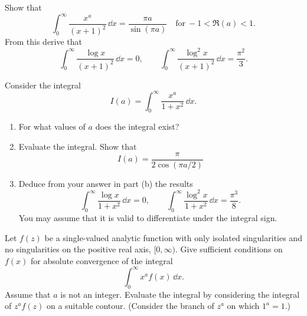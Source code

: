 {\begin{Exercise}
\end{Exercise}







\begin{Exercise}
  \label{exercise x^a/(x+1)^2}
  Show that
  \[
  \int_0^\infty \frac{x^a}{(x+1)^2}\,\dd x = \frac{\pi a}{\sin(\pi a)} \quad
  \mathrm{for}\ -1 < \Re(a) < 1.
  \]
  From this derive that
  \[
  \int_0^\infty \frac{\log x}{(x+1)^2} \,\dd x = 0, \qquad
  \int_0^\infty \frac{\log^2 x}{(x+1)^2}\,\dd x = \frac{\pi^2}{3}.
  \]

\end{Exercise}






\begin{Exercise}
  \label{exercise x^a/(1+x^2)}
  Consider the integral
  \[
  I(a) = \int_0^\infty \frac{x^a}{ 1 + x^2 } \,\dd x.
  \]
  \begin{enumerate}
  \item
    For what values of $a$ does the integral exist?
  \item
    Evaluate the integral.  Show that
    \[
    I(a) = \frac{ \pi }{ 2 \cos (\pi a / 2) }
    \]
  \item
    Deduce from your answer in part (b) the results
    \[
    \int_0^\infty \frac{ \log x }{ 1 + x^2 } \,\dd x = 0, \qquad
    \int_0^\infty \frac{ \log^2 x }{ 1 + x^2 } \,\dd x = \frac{\pi^3 }{ 8 }.
    \]
    You may assume that it is valid to differentiate under the integral sign.
  \end{enumerate}

\end{Exercise}










\begin{Exercise}
  \label{exercise x^a f(x)}
  Let $f(z)$ be a single-valued analytic function with only isolated
  singularities and no singularities on the positive real axis, $[0,\infty)$.
  Give sufficient conditions on $f(x)$ for absolute convergence of the integral
  \[
  \int_0^\infty x^a f(x) \,\dd x.
  \]
  Assume that $a$ is not an integer.  Evaluate the integral by considering the
  integral of $z^a f(z)$ on a suitable contour.
  (Consider the branch of $z^a$ on which $1^a = 1$.)


\end{Exercise}}
